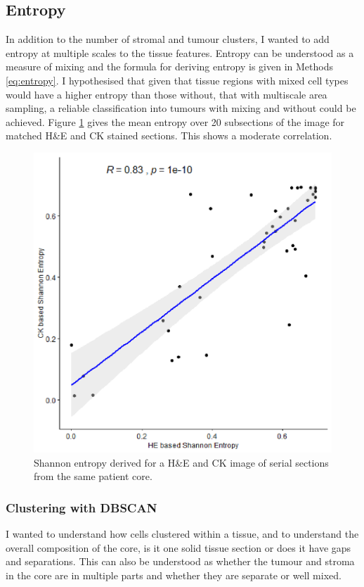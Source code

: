 \subsection{Entropy}
In addition to the number of stromal and tumour clusters, I wanted to add entropy at multiple scales to the tissue features. Entropy can be understood as a measure of mixing and the formula for deriving entropy is given in Methods \ref{eq:entropy}. I hypothesised that given that tissue regions with mixed cell types would have a higher entropy than those without, that with multiscale area sampling, a reliable classification into tumours with mixing and without could be achieved. Figure \ref{fig:entropy} gives the mean entropy over 20 subsections of the image for matched H\&E and CK stained sections. This shows a moderate correlation. 

\begin{figure}
    \centering
    \includegraphics{Chapter3/Figs/Thesis-06.png}
    \caption{Shannon entropy derived for a H\&E and CK image of serial sections from the same patient core.}
    \label{fig:entropy}
\end{figure}

\subsubsection*{Clustering with DBSCAN}
I wanted to understand how cells clustered within a tissue, and to understand the overall composition of the core, is it one solid tissue section or does it have gaps and separations. This can also be understood as whether the tumour and stroma in the core are in multiple parts and whether they are separate or well mixed.

